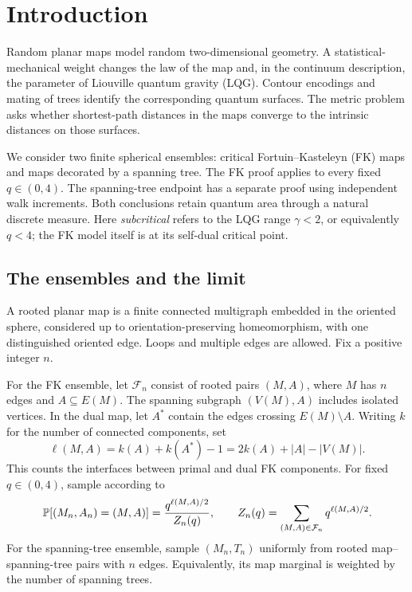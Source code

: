 \section{Introduction}\label{sec:introduction}\label{tree:sec:introduction}

Random planar maps model random two-dimensional geometry. A
statistical-mechanical weight changes the law of the map and, in the
continuum description, the parameter of Liouville quantum gravity (LQG).
Contour encodings and mating of trees identify the corresponding quantum
surfaces. The metric problem asks whether shortest-path distances in the
maps converge to the intrinsic distances on those surfaces.

We consider two finite spherical ensembles: critical
Fortuin--Kasteleyn (FK) maps and maps decorated by a spanning tree.
The FK proof applies to every fixed \(q\in(0,4)\). The spanning-tree
endpoint has a separate proof using independent walk increments.
Both conclusions retain quantum area through a natural discrete measure.
Here \emph{subcritical} refers to the LQG range \(\gamma<2\), or equivalently
\(q<4\); the FK model itself is at its self-dual critical point.

\subsection{The ensembles and the limit}

A rooted planar map is a finite connected multigraph embedded in the
oriented sphere, considered up to orientation-preserving homeomorphism,
with one distinguished oriented edge. Loops and multiple edges are
allowed. Fix a positive integer \(n\).

For the FK ensemble, let \(\mathcal F_n\) consist of rooted pairs
\((M,A)\), where \(M\) has \(n\) edges and \(A\subseteq E(M)\).
The spanning subgraph \((V(M),A)\) includes isolated vertices. In the
dual map, let \(A^*\) contain the edges crossing \(E(M)\setminus A\).
Writing \(k\) for the number of connected components, set
\[
 \ell(M,A)=k(A)+k(A^*)-1=2k(A)+|A|-|V(M)|.
\]
This counts the interfaces between primal and dual FK components.
For fixed \(q\in(0,4)\), sample according to
\begin{equation}\label{eq:fk-law}
 \mathbb P[(M_n,A_n)=(M,A)]
  =\frac{q^{\ell(M,A)/2}}{Z_n(q)},
 \qquad Z_n(q)=\sum_{(M,A)\in\mathcal F_n}q^{\ell(M,A)/2}.
\end{equation}
For the spanning-tree ensemble, sample \((M_n,T_n)\) uniformly from
rooted map--spanning-tree pairs with \(n\) edges. Equivalently, its map
marginal is weighted by the number of spanning trees.

